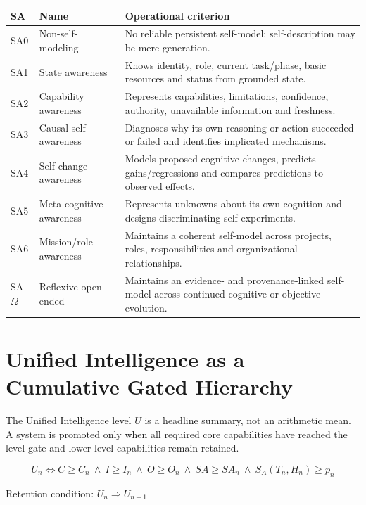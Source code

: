 \documentclass[11pt]{article}
\theoremstyle{definition}
\newcommand{\Om}{\ensuremath{\Omega}}
\begin{document}
\begin{table}[h]
\centering\small
\begin{tabularx}{\textwidth}{@{}llY@{}}
\toprule
SA & Name & Operational criterion \\
\midrule
SA0 & Non-self-modeling & No reliable persistent self-model; self-description may be mere generation. \\
SA1 & State awareness & Knows identity, role, current task/phase, basic resources and status from grounded state. \\
SA2 & Capability awareness & Represents capabilities, limitations, confidence, authority, unavailable information and freshness. \\
SA3 & Causal self-awareness & Diagnoses why its own reasoning or action succeeded or failed and identifies implicated mechanisms. \\
SA4 & Self-change awareness & Models proposed cognitive changes, predicts gains/regressions and compares predictions to observed effects. \\
SA5 & Meta-cognitive awareness & Represents unknowns about its own cognition and designs discriminating self-experiments. \\
SA6 & Mission/role awareness & Maintains a coherent self-model across projects, roles, responsibilities and organizational relationships. \\
SA\Om{} & Reflexive open-ended & Maintains an evidence- and provenance-linked self-model across continued cognitive or objective evolution. \\
\bottomrule
\end{tabularx}
\end{table}

\section{Unified Intelligence as a Cumulative Gated Hierarchy}

The Unified Intelligence level $U$ is a headline summary, not an arithmetic mean. A system is promoted only when all required core capabilities have reached the level gate and lower-level capabilities remain retained.

\begin{equation}
U_n \iff C \ge C_n \ \wedge\ I \ge I_n \ \wedge\ O \ge O_n \ \wedge\ SA \ge SA_n \ \wedge\ S_A(T_n,H_n) \ge p_n
\end{equation}
\begin{center}Retention condition: $U_n \Rightarrow U_{n-1}$\end{center}
\end{document}
